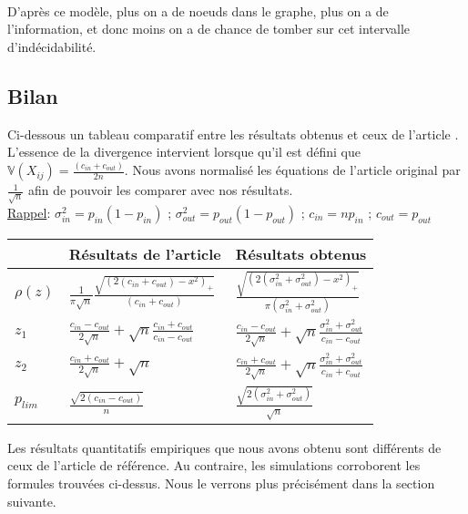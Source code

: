 \paragraph{}\label{rq:ngrand}
D'après ce modèle, plus on a de noeuds dans le graphe, plus on a de l'information, et donc moins on a de chance de tomber sur cet intervalle d’indécidabilité.\\

\subsection{Bilan}
Ci-dessous un tableau comparatif entre les résultats obtenus et ceux de l'article \cite{raj_rao}.
L'essence de la divergence intervient lorsque qu'il est défini que $\mathbb{V}(X_{ij}) = \frac{(c_{in} + c_{out})}{2n}$.
Nous avons normalisé les équations de l'article original par $\frac{1}{\sqrt{n}}$ afin de pouvoir les comparer avec nos résultats.\\
\underline{Rappel}: $\sigma_{in}^2=p_{in}(1-p_{in})$ ; $\sigma_{out}^2=p_{out}(1-p_{out})$ ; $c_{in} = np_{in}$ ; $c_{out} = p_{out}$

\renewcommand{\arraystretch}{2}
\begin{table}[h] 
	\label{tab:bilan}
	\centering
    \begin{tabular}{|l|l|l|}
    \hline
      &  Résultats de l'article  &  Résultats obtenus \\ \hline
    $\rho (z)$  &  $\frac{1}{\pi\sqrt{n}}\frac{\sqrt{(2(c_{in} + c_{out}) - x^2)_+}}{(c_{in} + c_{out})}$&  $\frac{\sqrt{(2(\sigma_{in}^2 + \sigma_{out}^2) - x^2)_+}}{\pi(\sigma_{in}^2 + \sigma_{out}^2)}$\\ \hline
    $z_1$&  $\frac{c_{in}-c_{out}}{2\sqrt{n}} + \sqrt{n}\frac{c_{in}+c_{out}}{c_{in}-c_{out}}$ &  $\frac{c_{in}-c_{out}}{2\sqrt{n}} + \sqrt{n}\frac{\sigma_{in}^2+\sigma_{out}^2}{c_{in}-c_{out}}$\\ \hline
    $z_2$&  $\frac{c_{in}+c_{out}}{2\sqrt{n}} + \sqrt{n}$ &  $\frac{c_{in}+c_{out}}{2\sqrt{n}} + \sqrt{n}\frac{\sigma_{in}^2+\sigma_{out}^2}{c_{in}+c_{out}}$\\ \hline
    $p_{lim}$&  $\frac{\sqrt{2(c_{in} - c_{out})}}{n}$ &  $\frac{\sqrt{2(\sigma_{in}^2 + \sigma_{out}^2)}}{\sqrt{n}}$\\ \hline
    \end{tabular}
\end{table}

Les résultats quantitatifs empiriques que nous avons obtenu sont différents de ceux de l'article de référence.
Au contraire, les simulations corroborent les formules trouvées ci-dessus.
Nous le verrons plus précisément dans la section suivante.   
